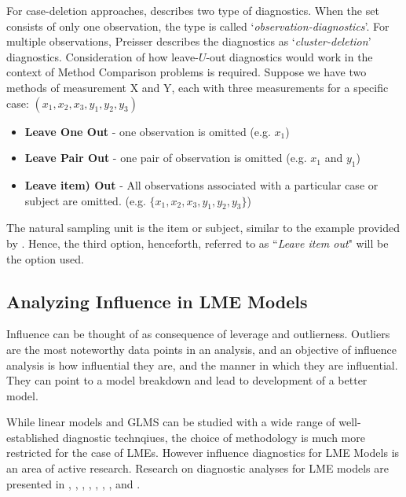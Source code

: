 \documentclass[12pt, a4paper]{report}
\theoremstyle{definition}
\theoremstyle{remark}
\begin{document}
For case-deletion approaches, \citet{preisser} describes two type of diagnostics. When the set consists of only one observation, the type is called
`\textit{observation-diagnostics}'. For multiple observations, Preisser describes the diagnostics as `\textit{cluster-deletion}' diagnostics. Consideration of how leave-$U$-out diagnostics would work in the context of Method Comparison problems is required.  Suppose we have two methods of measurement X and Y, each with three measurements for a specific case: $(x_1,x_2,x_3,y_1,y_2,y_3)$

\begin{itemize}
	\item \textbf{Leave One Out} - one observation is omitted (e.g. $x_1$)
	\item \textbf{Leave Pair Out} - one pair of observation  is omitted (e.g. $x_1$ and $y_1$)
	\item \textbf{Leave item) Out} - All observations associated with a particular case or subject are omitted. (e.g. $\{x_1,x_2,x_3,y_1,y_2,y_3\}$)
\end{itemize}

The natural sampling unit is the item or subject, similar to the example provided by \citet{schabenberger}. Hence, the third option, henceforth, referred to as ``\textit{Leave item out}" will be the option used.

\subsection{Analyzing Influence in LME Models}







Influence can be thought of as consequence of leverage and outlierness. Outliers are the most noteworthy data points in an analysis, and an objective of influence analysis is how influential they are, and the manner in which they are influential. They can point to a model breakdown and lead to development of a better model.

While linear models and GLMS can be studied with a wide range of well-established diagnostic technqiues, the choice of methodology is much more restricted for the case of LMEs. However
influence diagnostics for LME Models is an area of active research. Research on diagnostic analyses for LME models are presented in \citet{Beckman}, 
\citet{Christensen}, \citet{hilden1995}, \citet{lesaffre1998local}, \citet{Banerjee1997}, 
\citet{fung2002}, \citet{Demi}, \citet{Zewotir} and \citet{NobreSinger2007, NobreSinger2011}.
\end{document}
